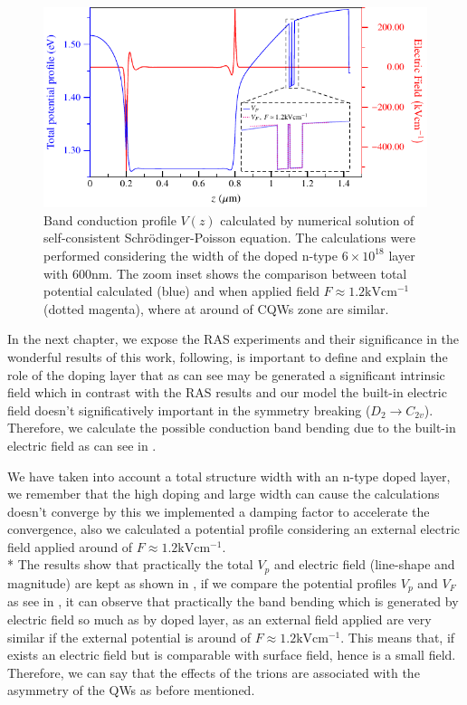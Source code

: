 \begin{figure}[ht!]
	\centering
	\includegraphics[width=\textwidth]{../figures/chapter-3/poisson/build/poisson-3.pdf}
	\caption{Band conduction profile $V(z)$ calculated by numerical solution of self-consistent Schr\"odinger-Poisson equation. The calculations were performed considering the width of the doped n-type $6\times 10^{18}$ layer with  600nm. The zoom inset shows the comparison between total potential calculated (blue) and when applied field $F\!\approx\! 1.2 \mathrm{kVcm^{-1}}$ (dotted magenta), where at around of CQWs zone are similar.}
	\label{fig:chapter-3-pr-poisson-3}
\end{figure}
In the next chapter, we expose the RAS experiments and their significance in the wonderful results of this work, following, is important to define and explain the role of the doping layer that as can see may be generated a significant intrinsic field which in contrast with the RAS results and our model the built-in electric field doesn't significatively important in the symmetry breaking ($D_{2} \to C_{2v}$).  Therefore, we calculate the possible conduction band bending due to the built-in electric field as can see in .

We have taken into account a total structure width with an n-type doped layer,  we remember that the high doping and large width can cause the calculations doesn't converge by this we implemented a damping factor to accelerate the convergence, also we calculated a  potential profile considering an external electric field applied around of $F\!\approx\! 1.2 \mathrm{kVcm^{-1}}$. \\*
The results show that practically the total $V_p$ and electric field (line-shape and magnitude) are kept as shown in , if we compare the potential profiles $V_{p}$ and $V_{F}$ as see in , it can observe that practically the band bending which is generated by electric field so much as by doped layer, as an external field applied are very similar if the external potential is around of $F\!\approx\! 1.2 \mathrm{kVcm^{-1}}$. This means that, if exists an electric field but is comparable with surface field\cite{lastras1999model}, hence is a small field. 
Therefore, we can say that the effects of the trions are associated with the asymmetry of the QWs as before mentioned.



